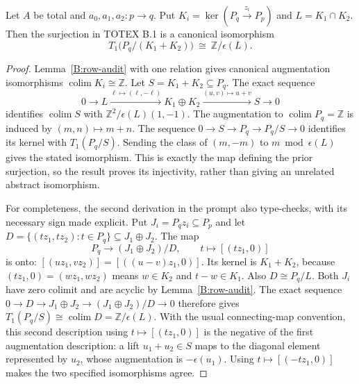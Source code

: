 \begin{proposition}\label{B:lead1}
Let $A$ be total and $a_0,a_1,a_2:p\to q$.  Put
$K_i=\ker(P_q\xrightarrow{z_i}P_p)$ and $L=K_1\cap K_2$.
Then the surjection in TOTEX B.1 is a canonical isomorphism
\[
 T_1\bigl(P_q/(K_1+K_2)\bigr)\ \cong\
 \mathbb Z/\epsilon(L).
\]
\end{proposition}
\begin{proof}
Lemma~\ref{B:row-audit} with one relation gives canonical augmentation
isomorphisms $\operatorname{colim}K_i\cong\mathbb Z$.
Let $S=K_1+K_2\subseteq P_q$.  The exact sequence
\[
 0\longrightarrow L\xrightarrow{\ell\mapsto(\ell,-\ell)}
 K_1\oplus K_2\xrightarrow{(u,v)\mapsto u+v}S\longrightarrow0
\]
identifies $\operatorname{colim}S$ with
$\mathbb Z^2/\epsilon(L)(1,-1)$.  The augmentation to
$\operatorname{colim}P_q=\mathbb Z$ is induced by $(m,n)\mapsto m+n$.
The sequence $0\to S\to P_q\to P_q/S\to0$ identifies its kernel
with $T_1(P_q/S)$.  Sending the class of $(m,-m)$ to
$m\bmod\epsilon(L)$ gives the stated isomorphism.  This is exactly
the map defining the prior surjection, so the result proves its
injectivity, rather than giving an unrelated abstract isomorphism.

For completeness, the second derivation in the prompt also type-checks,
with its necessary sign made explicit.  Put
$J_i=P_qz_i\subseteq P_p$ and let
$D=\{(tz_1,tz_2):t\in P_q\}\subseteq J_1\oplus J_2$.
The map
\[
 P_q\longrightarrow (J_1\oplus J_2)/D,
 \qquad t\longmapsto[(tz_1,0)]
\]
is onto: $[(uz_1,vz_2)]=[((u-v)z_1,0)]$.
Its kernel is $K_1+K_2$, because $(tz_1,0)=(wz_1,wz_2)$
means $w\in K_2$ and $t-w\in K_1$.  Also $D\cong P_q/L$.
Both $J_i$ have zero colimit and are acyclic by
Lemma~\ref{B:row-audit}.  The exact sequence
$0\to D\to J_1\oplus J_2\to (J_1\oplus J_2)/D\to0$
therefore gives $T_1(P_q/S)\cong\operatorname{colim}D
=\mathbb Z/\epsilon(L)$.
With the usual connecting-map convention, this second description
using $t\mapsto[(tz_1,0)]$ is the negative of the first augmentation
description: a lift $u_1+u_2\in S$ maps to the diagonal element
represented by $u_2$, whose augmentation is $-\epsilon(u_1)$.
Using $t\mapsto[(-tz_1,0)]$ makes the two specified isomorphisms agree.
\end{proof}

